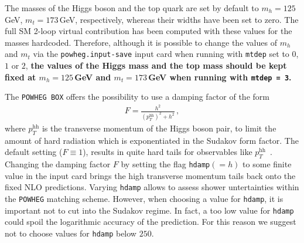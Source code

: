 \documentclass[paper]{JHEP3}
\newcommand\POWHEG{{\tt POWHEG}}
\newcommand\POWHEGBOX{{\tt POWHEG BOX}}
\newcommand\pthh{\ensuremath{p_{T}^{\mathrm{hh}}}\xspace}
\begin{document}
The masses of the Higgs boson and the top quark are set by default to
$m_h=125$\,GeV, $m_t=173$\,GeV, respectively, whereas their widths
have been set to zero. The full SM 2-loop virtual contribution has
been computed with these values for the masses hardcoded. 
Therefore, although it is possible to change the values of $m_h$
and $m_t$ via the {\tt powheg.input-save} input card when running with
{\tt mtdep} set to $0$, $1$ or $2$, {\bf the values of the Higgs mass and
the top mass should be kept fixed at $m_h=125$\,GeV and $m_t=173$\,GeV
when running with {\tt mtdep = 3}.}

The \POWHEGBOX{} offers the possibility to use a damping factor of the
form~\cite{Alioli:2008tz,Alioli:2009je}
\begin{align}
  F=\frac{h^{2}}{(\pthh)^2+h^{2}}\,,
\end{align}
where \pthh is the transverse momentum of the Higgs boson pair, to
limit the amount of hard radiation which is exponentiated in the
Sudakov form factor. The default setting ($F\equiv1$), results in
quite hard tails for observables like
$\pthh$~\cite{Heinrich:2017kxx}. Changing the damping factor $F$ by
setting the flag {\tt hdamp}$(=h)$ to some finite value in the input
card brings the high transverse momentum tails back onto the fixed NLO
predictions. Varying {\tt hdamp} allows to assess shower untertainties
within the \POWHEG{} matching scheme. However, when choosing a value
for {\tt hdamp}, it is important not to cut into the Sudakov
regime. In fact, a too low value for {\tt hdamp} could spoil the
logarithmic accuracy of the prediction. For this reason we suggest not
to choose values for {\tt hdamp} below $250$.
\end{document}

